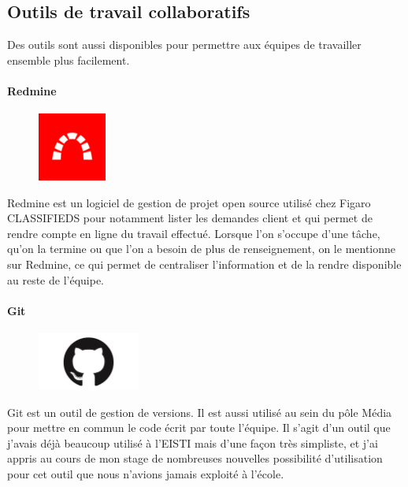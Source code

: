 \subsection{Outils de travail collaboratifs}
\label{subs:Outils de travail collaboratifs}
Des outils sont aussi disponibles pour permettre aux équipes de travailler ensemble plus facilement.
\paragraph{Redmine}
\label{par:Redmine}
\begin{figure}
  \begin{center}
    \includegraphics[width=0.20\textwidth]{Pictures/redmine_logo.png}
  \end{center}
\end{figure}
Redmine est un logiciel de gestion de projet open source utilisé chez Figaro CLASSIFIEDS pour notamment lister les demandes client et qui permet de rendre compte en ligne du travail effectué.
Lorsque l'on s'occupe d'une tâche, qu'on la termine ou que l'on a besoin de plus de renseignement, on le mentionne sur Redmine, ce qui permet de centraliser l'information et de la rendre disponible au reste de l'équipe.
\paragraph{Git}
\label{par:Git}
\begin{figure}
  \begin{center}
    \includegraphics[width=0.30\textwidth]{Pictures/git_logo.jpg}
  \end{center}
\end{figure}
Git est un outil de gestion de versions.
Il est aussi utilisé au sein du pôle Média pour mettre en commun le code écrit par toute l'équipe.
Il s'agit d'un outil que j'avais déjà beaucoup utilisé à l'EISTI mais d'une façon très simpliste, et j'ai appris au cours de mon stage de nombreuses nouvelles possibilité d'utilisation pour cet outil que nous n'avions jamais exploité à l'école.
